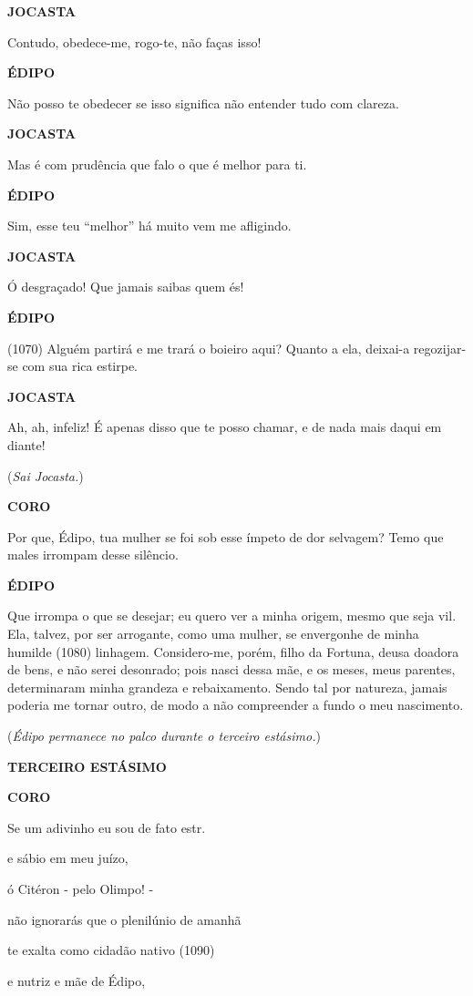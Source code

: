 \textbf{JOCASTA}

Contudo, obedece-me, rogo-te, não faças isso!

\textbf{ÉDIPO}

Não posso te obedecer se isso significa não entender tudo com clareza.

\textbf{JOCASTA}

Mas é com prudência que falo o que é melhor para ti.

\textbf{ÉDIPO}

Sim, esse teu ``melhor'' há muito vem me afligindo.

\textbf{JOCASTA}

Ó desgraçado! Que jamais saibas quem és!

\textbf{ÉDIPO}

(1070) Alguém partirá e me trará o boieiro aqui? Quanto a ela, deixai-a
regozijar-se com sua rica estirpe.

\textbf{JOCASTA}

Ah, ah, infeliz! É apenas disso que te posso chamar, e de nada mais
daqui em diante!

(\emph{Sai Jocasta.})

\textbf{CORO}

Por que, Édipo, tua mulher se foi sob esse ímpeto de dor selvagem? Temo
que males irrompam desse silêncio.

\textbf{ÉDIPO}

Que irrompa o que se desejar; eu quero ver a minha origem, mesmo que
seja vil. Ela, talvez, por ser arrogante, como uma mulher, se envergonhe
de minha humilde (1080) linhagem. Considero-me, porém, filho da Fortuna,
deusa doadora de bens, e não serei desonrado; pois nasci dessa mãe, e os
meses, meus parentes, determinaram minha grandeza e rebaixamento. Sendo
tal por natureza, jamais poderia me tornar outro, de modo a não
compreender a fundo o meu nascimento.

(\emph{Édipo permanece no palco durante o terceiro estásimo.})

\textbf{TERCEIRO ESTÁSIMO}

\textbf{CORO}

Se um adivinho eu sou de fato estr.

e sábio em meu juízo,

ó Citéron - pelo Olimpo! -

não ignorarás que o plenilúnio de amanhã

te exalta como cidadão nativo (1090)

e nutriz e mãe de Édipo,

